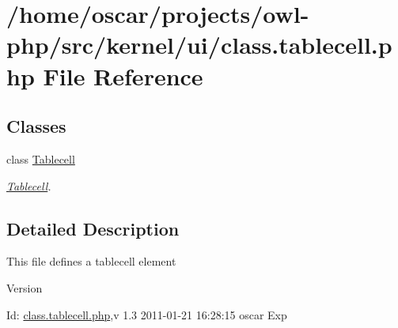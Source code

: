 \section{/home/oscar/projects/owl-\/php/src/kernel/ui/class.tablecell.php File Reference}
\label{class_8tablecell_8php}
\subsection*{Classes}
\begin{DoxyCompactItemize}
\item 
class \hyperlink{classTablecell}{Tablecell}
\begin{DoxyCompactList}\small\item\em \hyperlink{classTablecell}{Tablecell}. \item\end{DoxyCompactList}\end{DoxyCompactItemize}


\subsection{Detailed Description}
This file defines a tablecell element \begin{DoxyVersion}{Version}

\end{DoxyVersion}
\begin{DoxyParagraph}{Id:}
\hyperlink{class_8tablecell_8php}{class.tablecell.php},v 1.3 2011-\/01-\/21 16:28:15 oscar Exp 
\end{DoxyParagraph}
